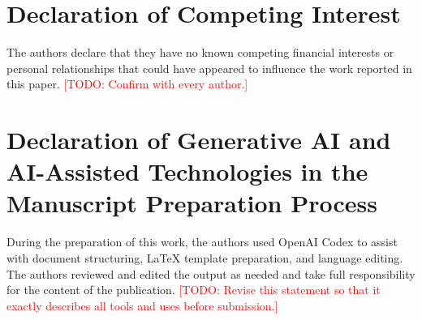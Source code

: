 \documentclass[preprint,12pt]{elsarticle}
\newcommand{\todo}[1]{\textcolor{red}{[TODO: #1]}}
\begin{document}
\section*{Declaration of Competing Interest}

The authors declare that they have no known competing financial interests or personal relationships that could have appeared to influence the work reported in this paper. \todo{Confirm with every author.}

\section*{Declaration of Generative AI and AI-Assisted Technologies in the Manuscript Preparation Process}

During the preparation of this work, the authors used OpenAI Codex to assist with document structuring, LaTeX template preparation, and language editing. The authors reviewed and edited the output as needed and take full responsibility for the content of the publication. \todo{Revise this statement so that it exactly describes all tools and uses before submission.}



\end{document}
